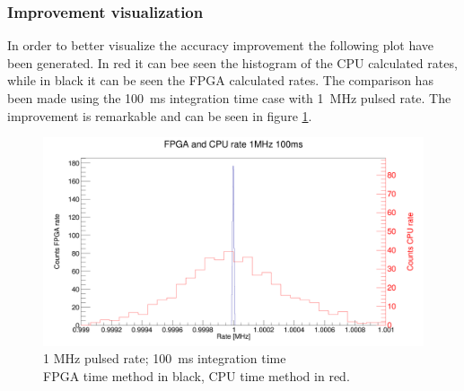 \subsubsection{Improvement visualization}
\noindent In order to better visualize the accuracy improvement the following plot have been generated. In red it can bee seen the histogram of the CPU calculated rates, while in black it can be seen the FPGA calculated rates. The comparison has been made using the 100~ms integration time case with 1~MHz pulsed rate. The improvement is remarkable and can be seen in figure \ref{fig:FPGA_and_CPU_rate_1MHz_100ms}. 
\begin{figure}[H]
	\centering
	\includegraphics[width=0.95\linewidth]{IMG/ch5/RateMeasures/FPGA_and_CPU_rate_1MHz_100ms}
	\caption{1 MHz pulsed rate; 100~ms integration time\\FPGA time method in black, CPU time method in red.}
	\label{fig:FPGA_and_CPU_rate_1MHz_100ms}
\end{figure}











